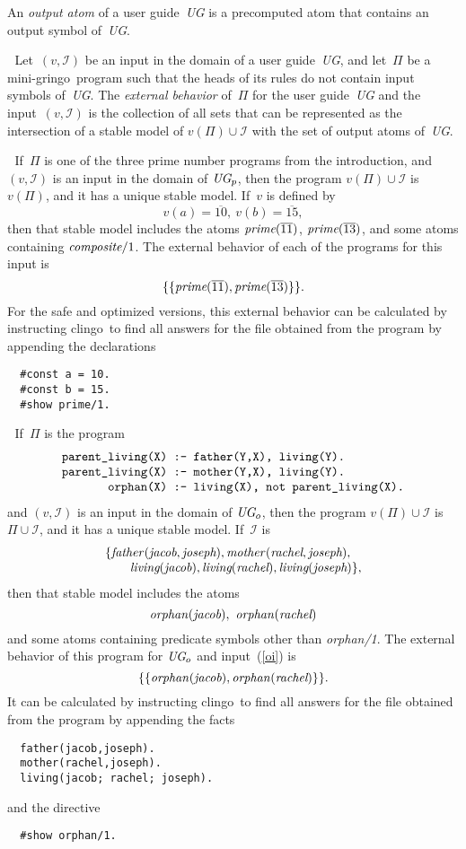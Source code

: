 \documentclass{article}
\def\beq{\begin{equation}}
\def\eeq#1{\label{#1}\end{equation}}
\def\ba{\begin{array}}
\def\ea{\end{array}}
\def\gringo{{\sc gringo}}
\def\clingo{{\sc clingo}}
\def\num{\overline}
\newcommand{\I}{\mathcal{I}}
\begin{document}
    An \emph{output atom} of a user guide~\emph{UG} is a precomputed atom
    that contains an output symbol of~\emph{UG}.
    
    \medskip{}$\;$
    Let~$(v,\I)$ be an input in the domain
    of a user guide~\emph{UG}, and let~$\Pi$ be
a mini-\gringo\ program such that the heads of its rules do not
contain input symbols of~\emph{UG}.  The \emph{external behavior} of~$\Pi$
for the user guide~\emph{UG} and the input~$(v,\I)$ is the collection
of all sets that can be represented as the intersection of a stable model
of $v(\Pi)\cup\I$ with the set of output atoms of~\emph{UG}.

\medskip{}$\;$ If~$\Pi$ is one of the
three prime number programs from the introduction, and $(v,\I)$ is an
input in the domain of $\emph{UG}_p$, then the program $v(\Pi)\cup\I$
is $v(\Pi)$, and it has a unique stable model.  If~$v$ is defined by
$$v(a)=\num{10},\ v(b)=\num{15},$$
then that stable model includes the atoms $\emph{prime}(\num{11})$,
$\emph{prime}(\num{13})$, and some atoms containing
$\emph{composite}/1$.  The external behavior of each of the programs
for this input is
$$\{\{\emph{prime}(\num{11}),\emph{prime}(\num{13})\}\}.$$
For the safe and optimized versions, this external behavior
can be calculated by instructing \clingo\ to
find all answers for the file obtained from the program by appending the
declarations
\begin{verbatim}
  #const a = 10.
  #const b = 15.
  #show prime/1.
\end{verbatim}

\medskip{}$\;$ If~$\Pi$ is the program
\beq\ba l
\verb|parent_living(X) :- father(Y,X), living(Y).|\\
\verb|parent_living(X) :- mother(Y,X), living(Y).|\\
\verb|       orphan(X) :- living(X), not parent_living(X).|
\ea\eeq{orphan1}
and $(v,\I)$ is an input in the domain of $\emph{UG}_o$, then the
program $v(\Pi)\cup\I$ is $\Pi\cup\I$, and it has a unique stable model.
If~$\I$ is
\beq\ba l
\{\emph{father\/}(\emph{jacob},\emph{joseph}),
\emph{mother\/}(\emph{rachel},\emph{joseph}),\\
\quad \quad \emph{living}(\emph{jacob}),
\emph{living}(\emph{rachel}),
\emph{living}(\emph{joseph})\},
\ea\eeq{oi}
then that stable model includes the atoms
$$\emph{orphan\/}(\emph{jacob}),\ \emph{orphan\/}(\emph{rachel})$$
and some atoms containing predicate symbols other than \emph{orphan/1}.
The external behavior of this program for $\emph{UG}_o$ and input~(\ref{oi})
is
\beq
\{\{\emph{orphan\/}(\emph{jacob}),\emph{orphan\/}(\emph{rachel})\}\}.
\eeq{ebor}
It can be calculated by instructing \clingo\ to
find all answers for the file obtained from the program by appending the
facts
\begin{verbatim}
  father(jacob,joseph).
  mother(rachel,joseph).
  living(jacob; rachel; joseph).
\end{verbatim}
and the directive
\begin{verbatim}
  #show orphan/1.
\end{verbatim}
\end{document}
